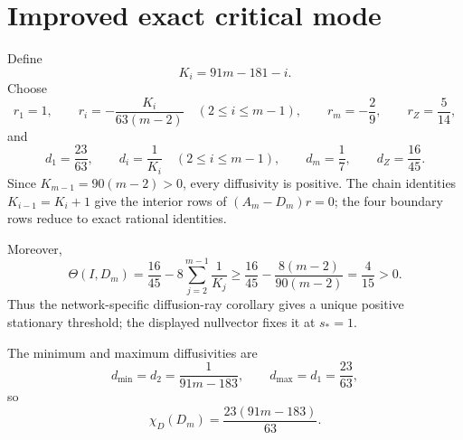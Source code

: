 \section*{Improved exact critical mode}
Define
\[
K_i=91m-181-i.
\]
Choose
\[
r_1=1,
\qquad
r_i=-\frac{K_i}{63(m-2)}\quad(2\le i\le m-1),
\qquad
r_m=-\frac29,
\qquad
r_Z=\frac5{14},
\]
and
\[
d_1=\frac{23}{63},
\qquad
d_i=\frac1{K_i}\quad(2\le i\le m-1),
\qquad
d_m=\frac17,
\qquad
d_Z=\frac{16}{45}.
\]
Since $K_{m-1}=90(m-2)>0$, every diffusivity is positive.  The chain identities
$K_{i-1}=K_i+1$ give the interior rows of $(A_m-D_m)r=0$; the four boundary
rows reduce to exact rational identities.

Moreover,
\[
\Theta(I,D_m)=\frac{16}{45}-8\sum_{j=2}^{m-1}\frac1{K_j}
\ge \frac{16}{45}-\frac{8(m-2)}{90(m-2)}=\frac4{15}>0.
\]
Thus the network-specific diffusion-ray corollary gives a unique positive stationary threshold;
the displayed nullvector fixes it at $s_*=1$.

The minimum and maximum diffusivities are
\[
d_{\min}=d_2=\frac1{91m-183},
\qquad
d_{\max}=d_1=\frac{23}{63},
\]
so
\[
\boxed{\chi_D(D_m)=\frac{23(91m-183)}{63}.}
\]
